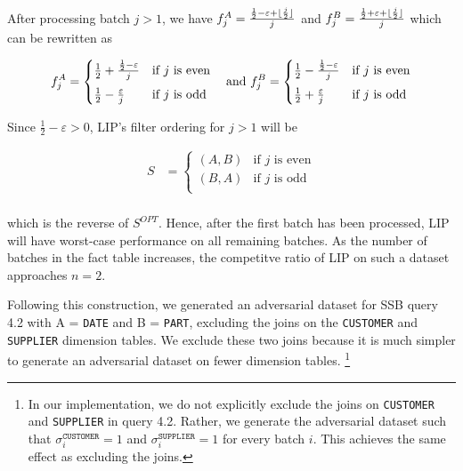 \DeclarePairedDelimiter\floor{\lfloor}{\rfloor}
After processing batch $j > 1$, we have 
$f_j^A = \frac{\frac{1}{2} - \varepsilon + \floor{\frac{j}{2}}}{j}$ 
and 
$f_j^B = \frac{\frac{1}{2} + \varepsilon + \floor{\frac{j}{2}}}{j}$  
which can be rewritten as

\begin{equation*}
f_j^A = 
    \begin{cases}
    \frac{1}{2} + \frac{\frac{1}{2}-\varepsilon}{j} & \text{if $j$ is even} \\[0.5em]
    \frac{1}{2} - \frac{\varepsilon}{j} &  \text{if $j$ is odd} \\
    \end{cases}  \quad \text{and }
f_j^B = 
    \begin{cases}
    \frac{1}{2} - \frac{\frac{1}{2}-\varepsilon}{j} & \text{if $j$ is even} \\[0.5em]
    \frac{1}{2} + \frac{\varepsilon}{j} &  \text{if $j$ is odd} \\
    \end{cases}\\[0.5em]
\end{equation*}

Since $\frac{1}{2} - \varepsilon > 0$, LIP's filter ordering for $j > 1$ will be

\begin{align*}
S &= 
    \begin{cases}
    (A, B) & \text{if $j$ is even} \\[0.5em]
    (B, A) & \text{if $j$ is odd} \\
    \end{cases}\\[0.5em]
\end{align*}

which is the reverse of $S^{OPT}$. 
Hence, after the first batch has been processed, LIP will have worst-case performance on all remaining batches. 
As the number of batches in the fact table increases, the competitve ratio of LIP on such a dataset approaches $n =2$.

Following this construction, we generated an adversarial dataset for SSB query 4.2 with A = \texttt{DATE} and B = \texttt{PART},
excluding the joins on the \texttt{CUSTOMER} and \texttt{SUPPLIER} dimension tables.
We exclude these two joins because it is much simpler to generate an adversarial dataset on fewer dimension tables.
\footnote{In our implementation, we do not explicitly exclude the joins on \texttt{CUSTOMER} and \texttt{SUPPLIER} in query 4.2. 
Rather, we generate the adversarial dataset such that $\sigma_i^{\texttt{CUSTOMER}}=1$ and $\sigma_i^{\texttt{SUPPLIER}}=1$ for every batch $i$.
This achieves the same effect as excluding the joins.}

